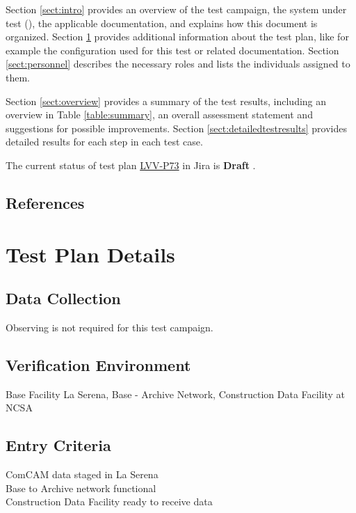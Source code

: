 \documentclass[DM,lsstdraft,STR,toc]{lsstdoc}
\begin{document}
Section \ref{sect:intro} provides an overview of the test campaign, the system under test (\product{}),
the applicable documentation, and explains how this document is organized.
Section \ref{sect:testplan} provides additional information about the test plan, like for example the configuration
used for this test or related documentation.
Section \ref{sect:personnel} describes the necessary roles and lists the individuals assigned to them.

Section \ref{sect:overview} provides a summary of the test results, including an overview in Table \ref{table:summary},
an overall assessment statement and suggestions for possible improvements.
Section \ref{sect:detailedtestresults} provides detailed results for each step in each test case.

The current status of test plan \href{https://jira.lsstcorp.org/secure/Tests.jspa\#/testPlan/LVV-P73}{LVV-P73} in Jira is \textbf{ Draft }.

\subsection{References}
\label{sect:references}
\renewcommand{\refname}{}



\newpage
\section{Test Plan Details}
\label{sect:testplan}


\subsection{Data Collection}

  Observing is not required for this test campaign.

\subsection{Verification Environment}
\label{sect:hwconf}
  Base Facility La Serena, Base - Archive Network, Construction Data
Facility at NCSA

  \subsection{Entry Criteria}
  ComCAM data staged in La Serena\\
Base to Archive network functional\\
Construction Data Facility ready to receive data
\end{document}
